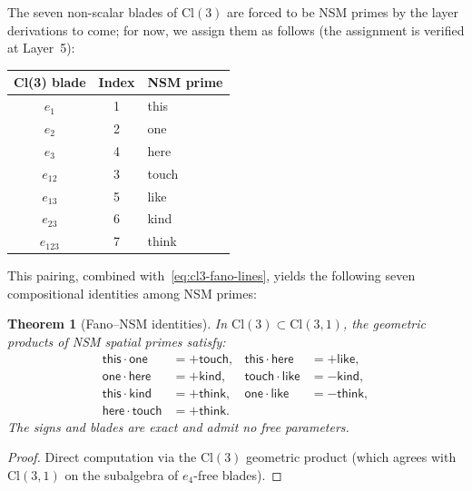\documentclass[11pt,a4paper]{article}
\theoremstyle{plain}
\newtheorem{theorem}{Theorem}[section]
\theoremstyle{definition}
\theoremstyle{remark}
\numberwithin{equation}{section}
\providecommand{\Cl}{\mathrm{Cl}}
\begin{document}
The seven non-scalar blades of $\Cl(3)$ are forced to be
NSM primes by the layer derivations to come; for now, we assign
them as follows (the assignment is verified at Layer~5):

\begin{center}
\begin{tabular}{ccl}
\toprule
Cl(3) blade & Index & NSM prime \\
\midrule
$e_1$ & 1 & \textsf{this} \\
$e_2$ & 2 & \textsf{one} \\
$e_3$ & 4 & \textsf{here} \\
$e_{12}$ & 3 & \textsf{touch} \\
$e_{13}$ & 5 & \textsf{like} \\
$e_{23}$ & 6 & \textsf{kind} \\
$e_{123}$ & 7 & \textsf{think} \\
\bottomrule
\end{tabular}
\end{center}

This pairing, combined with~\eqref{eq:cl3-fano-lines}, yields the
following seven compositional identities among NSM primes:

\begin{theorem}[Fano--NSM identities]\label{thm:fano-nsm}
In $\Cl(3) \subset \Cl(3,1)$, the geometric products of NSM
spatial primes satisfy:
\begin{equation}\label{eq:fano-nsm}
\begin{aligned}
\mathsf{this} \cdot \mathsf{one} &= +\mathsf{touch}, &
\mathsf{this} \cdot \mathsf{here} &= +\mathsf{like}, \\
\mathsf{one} \cdot \mathsf{here} &= +\mathsf{kind}, &
\mathsf{touch} \cdot \mathsf{like} &= -\mathsf{kind}, \\
\mathsf{this} \cdot \mathsf{kind} &= +\mathsf{think}, &
\mathsf{one} \cdot \mathsf{like} &= -\mathsf{think}, \\
\mathsf{here} \cdot \mathsf{touch} &= +\mathsf{think}. & &
\end{aligned}
\end{equation}
The signs and blades are exact and admit no free parameters.
\end{theorem}

\begin{proof}
Direct computation via the $\Cl(3)$ geometric product (which
agrees with $\Cl(3,1)$ on the subalgebra of $e_4$-free blades).
\end{proof}
\end{document}
